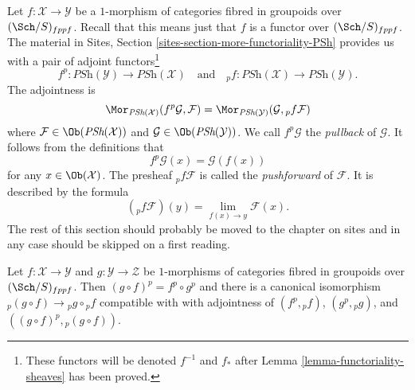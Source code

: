 \medskip\noindent
Let $f : \mathcal{X} \to \mathcal{Y}$ be a $1$-morphism of categories
fibred in groupoids over $(\Sch/S)_{fppf}$. Recall that this
means just that $f$ is a functor over $(\Sch/S)_{fppf}$.
The material in
Sites, Section \ref{sites-section-more-functoriality-PSh}
provides us with a pair of adjoint functors\footnote{These functors
will be denoted $f^{-1}$ and $f_*$ after
Lemma \ref{lemma-functoriality-sheaves}
has been proved.}
\begin{equation}
\label{equation-pushforward-pullback}
f^p : \textit{PSh}(\mathcal{Y}) \longrightarrow \textit{PSh}(\mathcal{X})
\quad\text{and}\quad
{}_pf : \textit{PSh}(\mathcal{X}) \longrightarrow \textit{PSh}(\mathcal{Y}).
\end{equation}
The adjointness is
$$
\Mor_{\textit{PSh}(\mathcal{X})}(f^p\mathcal{G}, \mathcal{F})
=
\Mor_{\textit{PSh}(\mathcal{Y})}(\mathcal{G}, {}_pf\mathcal{F})
$$
where $\mathcal{F} \in \Ob(\textit{PSh}(\mathcal{X}))$ and
$\mathcal{G} \in \Ob(\textit{PSh}(\mathcal{Y}))$. We call
$f^p\mathcal{G}$ the {\it pullback} of $\mathcal{G}$. It follows
from the definitions that
$$
f^p\mathcal{G}(x) = \mathcal{G}(f(x))
$$
for any $x \in \Ob(\mathcal{X})$. The presheaf ${}_pf\mathcal{F}$
is called the {\it pushforward} of $\mathcal{F}$. It is described
by the formula
$$
({}_pf\mathcal{F})(y) = \lim_{f(x) \to y} \mathcal{F}(x).
$$
The rest of this section should probably be moved to the chapter
on sites and in any case should be skipped on a first reading.

\begin{lemma}
\label{lemma-1-morphisms-presheaves}
Let $f : \mathcal{X} \to \mathcal{Y}$ and $g : \mathcal{Y} \to \mathcal{Z}$
be $1$-morphisms of categories fibred in groupoids over
$(\Sch/S)_{fppf}$. Then $(g \circ f)^p = f^p \circ g^p$ and
there is a canonical isomorphism
${}_p(g \circ f) \to {}_pg \circ {}_pf$
compatible with with adjointness of $(f^p, {}_pf)$, $(g^p, {}_pg)$, and
$((g \circ f)^p, {}_p(g \circ f))$.
\end{lemma}

